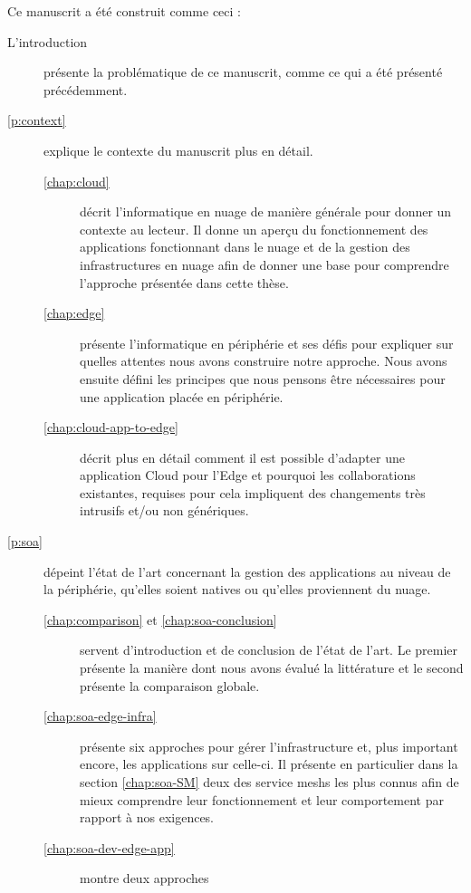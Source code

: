 Ce manuscrit a été construit comme ceci :
\begin{description}
\item [L'introduction] présente la problématique de ce manuscrit,
  comme ce qui a été présenté précédemment.
\item [\autoref{p:context}] explique le contexte du manuscrit plus en détail.
  \begin{description}
  \item [\autoref{chap:cloud}] décrit l'informatique en nuage de
    manière générale pour donner un contexte au lecteur. Il donne un
    aperçu du fonctionnement des applications fonctionnant dans le
    nuage et de la gestion des infrastructures en nuage afin de donner
    une base pour comprendre l'approche présentée dans cette thèse.
  \item[\autoref{chap:edge}] présente l'informatique en périphérie et
    ses défis pour expliquer sur quelles attentes nous avons
    construire notre approche. Nous avons ensuite défini les principes
    que nous pensons être nécessaires pour une application placée en
    périphérie.
  \item[\autoref{chap:cloud-app-to-edge}] décrit plus en détail
    comment il est possible d'adapter une application Cloud pour
    l'Edge et pourquoi les collaborations existantes, requises pour
    cela impliquent des changements très intrusifs et/ou non
    génériques.
  \end{description}
\item [\autoref{p:soa}] dépeint l'état de l'art concernant la gestion
  des applications au niveau de la périphérie, qu'elles soient natives
  ou qu'elles proviennent du nuage.
  \begin{description}
  \item[\autoref{chap:comparison} \textnormal{et}
    \autoref{chap:soa-conclusion}] servent d'introduction et de
    conclusion de l'état de l'art. Le premier présente la manière dont
    nous avons évalué la littérature et le second présente la
    comparaison globale.
  \item[\autoref{chap:soa-edge-infra}] présente six approches pour
    gérer l'infrastructure et, plus important encore, les applications
    sur celle-ci. Il présente en particulier dans la section
    \ref{chap:soa-SM} deux des service meshs les plus connus afin de
    mieux comprendre leur fonctionnement et leur comportement par
    rapport à nos exigences.
  \item [\autoref{chap:soa-dev-edge-app}] montre deux approches

\end{description}
\end{description}
